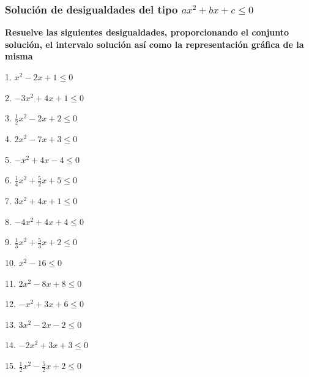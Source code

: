 \documentclass[12pt]{article}
\begin{document}
\subsubsection{\texorpdfstring{Solución de desigualdades del tipo
\(ax^2+bx+c\leq 0\)}{Solución de desigualdades del tipo ax\^{}2+bx+c\textbackslash leq 0}}\label{soluciuxf3n-de-desigualdades-del-tipo-ax2bxcleq-0}
\textbf{Resuelve las siguientes desigualdades, proporcionando el
conjunto solución, el intervalo solución así como la representación
gráfica de la misma}

\begin{multicols}{2}

1. $x^2-2x+1\leq0$

2. $-3x^2+4x+1\leq0$

3. $\frac{1}{2}x^2-2x+2\leq0$

4. $2x^2-7x+3\leq0$

5. $-x^2+4x-4\leq0$

6. $\frac{1}{4}x^2+\frac{5}{2}x+5\leq0$

7. $3x^2+4x+1\leq0$

8. $-4x^2+4x+4\leq0$

9. $\frac{1}{3}x^2+\frac{5}{3}x+2\leq0$

10. $x^2-16\leq0$

11. $2x^2-8x+8\leq0$

12. $-x^2+3x+6\leq0$

13. $3x^2-2x-2\leq0$

14. $-2x^2+3x+3\leq0$

15. $\frac{1}{2}x^2-\frac{5}{2}x+2\leq0$

\end{multicols}
\end{document}
